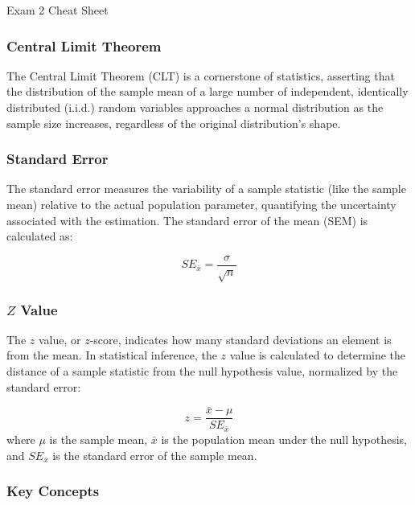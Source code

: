 \begin{cheatsheet}{Exam 2 Cheat Sheet}
{        \subsubsection*{Central Limit Theorem}
    
        The Central Limit Theorem (CLT) is a cornerstone of statistics, asserting that the distribution of the sample mean of a large number of independent, identically distributed (i.i.d.) random variables 
        approaches a normal distribution as the sample size increases, regardless of the original distribution's shape.
    
        \subsubsection*{Standard Error}
    
        The standard error measures the variability of a sample statistic (like the sample mean) relative to the actual population parameter, quantifying the uncertainty associated with the estimation. 
        The standard error of the mean (SEM) is calculated as:
    
        \begin{equation*}
            SE_{\bar{x}} = \frac{\sigma}{\sqrt{n}}
        \end{equation*}
    
        \subsubsection*{$Z$ Value}
    
        The $z$ value, or $z$-score, indicates how many standard deviations an element is from the mean. In statistical inference, the $z$ value is calculated to determine the distance of a sample statistic 
        from the null hypothesis value, normalized by the standard error:
    
        \begin{equation*}
            z = \frac{\bar{x} - \mu}{SE_{\bar{x}}}
        \end{equation*}
        where $\mu$ is the sample mean, $\bar{x}$ is the population mean under the null hypothesis, and $SE_{\bar{x}}$ is the standard error of the sample mean.
    
        \subsubsection*{Key Concepts}
    
}
\end{cheatsheet}

